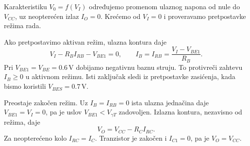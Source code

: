 Karakteristiku $V_0=f(V_I)$ određujemo promenom ulaznog napona od nule do $V_{CC}$, uz neopterećen izlaz $I_O=0$. Krećemo od $V_I=0$ i proveravamo pretpostavke režima rada.

Ako pretpostavimo aktivan režim, ulazna kontura daje
\[V_I-R_BI_{RB}-V_{BE1}=0,\qquad I_B=I_{RB}=\frac{V_I-V_{BE1}}{R_B}.\]
Pri $V_{BE1}=V_{BE}=0.6\,\mathrm{V}$ dobijamo negativnu baznu struju. To protivreči zahtevu $I_B\geq0$ u aktivnom režimu. Isti zaključak sledi iz pretpostavke zasićenja, kada bismo koristili $V_{BES}=0.7\,\mathrm{V}$.

Preostaje zakočen režim. Uz $I_B=I_{RB}=0$ ista ulazna jednačina daje $V_{BE1}=V_I=0$, pa je uslov $V_{BE1}<V_{\gamma T}$ zadovoljen. Izlazna kontura, nezavisno od režima, daje
\[V_O=V_{CC}-R_CI_{RC}.\]
Za neopterećeno kolo $I_{RC}=I_C$. Tranzistor je zakočen i $I_{C1}=0$, pa je $V_O=V_{CC}$.
